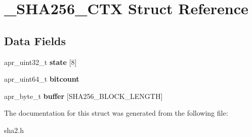 \hypertarget{struct___s_h_a256___c_t_x}{}\section{\+\_\+\+S\+H\+A256\+\_\+\+C\+TX Struct Reference}
\label{struct___s_h_a256___c_t_x}
\subsection*{Data Fields}
\begin{DoxyCompactItemize}
\item 
apr\+\_\+uint32\+\_\+t {\bfseries state} \mbox{[}8\mbox{]}\hypertarget{struct___s_h_a256___c_t_x_a651ee21c1ee494e3a6f755f1586acba7}{}\label{struct___s_h_a256___c_t_x_a651ee21c1ee494e3a6f755f1586acba7}

\item 
apr\+\_\+uint64\+\_\+t {\bfseries bitcount}\hypertarget{struct___s_h_a256___c_t_x_ad7f82a082163b345b5ac7a0f9478e5a6}{}\label{struct___s_h_a256___c_t_x_ad7f82a082163b345b5ac7a0f9478e5a6}

\item 
apr\+\_\+byte\+\_\+t {\bfseries buffer} \mbox{[}S\+H\+A256\+\_\+\+B\+L\+O\+C\+K\+\_\+\+L\+E\+N\+G\+TH\mbox{]}\hypertarget{struct___s_h_a256___c_t_x_a64c78dd109eb135023e28c3b17ea0c59}{}\label{struct___s_h_a256___c_t_x_a64c78dd109eb135023e28c3b17ea0c59}

\end{DoxyCompactItemize}


The documentation for this struct was generated from the following file\+:\begin{DoxyCompactItemize}
\item 
sha2.\+h\end{DoxyCompactItemize}
